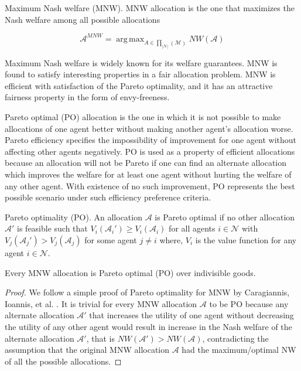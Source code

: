 \begin{definition}{Maximum Nash welfare (MNW).} \label{def_mnw}
MNW allocation is the one that maximizes the Nash welfare among all possible allocations

$$
    \mathcal{A}^{MNW} = \operatorname{arg\,max}_{A \in \prod_{|\mathcal{N}|}(\mathcal{M})} NW(\mathcal{A})
$$
\end{definition}


Maximum Nash welfare is widely known for its welfare guarantees. MNW is found to satisfy interesting properties in a fair allocation problem. MNW is efficient with satisfaction of the Pareto optimality, and it has an attractive fairness property in the form of envy-freeness.

Pareto optimal (PO) allocation is the one in which it is not possible to make allocations of one agent better without making another agent's allocation worse. Pareto efficiency specifies the impossibility of improvement for one agent without affecting other agents negatively. PO is used as a property of efficient allocations because an allocation will not be Pareto if one can find an alternate allocation which improves the welfare for at least one agent without hurting the welfare of any other agent. With existence of no such improvement, PO represents the best possible scenario under such efficiency preference criteria.

\begin{definition}{Pareto optimality (PO).}
An allocation $\mathcal{A}$ is Pareto optimal if no other allocation $\mathcal{A'}$ is feasible such that $V_i(\mathcal{A}_i') \geq V_i(\mathcal{A}_i)$ for all agents $i \in \mathcal{N}$ with $ V_j(\mathcal{A}_j') > V_j(\mathcal{A}_j)$ for some agent $j \neq i$ where, $V_i$ is the value function for any agent $i \in \mathcal{N}$.
\end{definition}

\begin{theorem}
Every MNW allocation is Pareto optimal (PO) over indivisible goods.
\end{theorem}

\begin{proof}
We follow a simple proof of Pareto optimality for MNW by Caragiannis, Ioannis, et al. \cite{caragiannis2016unreasonable}. It is trivial for every MNW allocation $\mathcal{A}$ to be PO because any alternate allocation $\mathcal{A}'$ that increases the utility of one agent without decreasing the utility of any other agent would result in increase in the Nash welfare of the alternate allocation $\mathcal{A}'$, that is $NW(\mathcal{A}') > NW(\mathcal{A})$, contradicting the assumption that the original MNW allocation $\mathcal{A}$ had the maximum/optimal NW of all the possible allocations. 
\end{proof}

